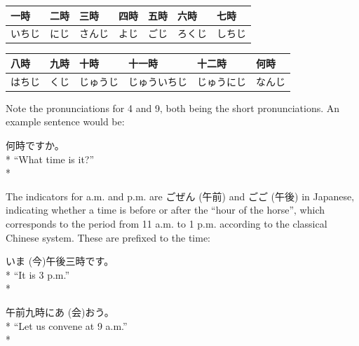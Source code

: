 \documentclass[11pt, b5paper, twoside, openright, onecolumn]{book}
\makeatletter
\newcommand*{\rubystack}[2]{{\relscale{0.5}%
  \begin{tabular}[b]{@{}c@{}}%
    {#1}\\%
   {\textscale{2}{#2}}%
  \end{tabular}}%
}
\DeclareRobustCommand*{\ruby}[2]{%
  \mbox{%
    \setlength{\parskip}{0ex}%
    \BeginAccSupp{method=pdfstringdef,ActualText={#1}}%
      \rubystack{\phantom{#2}}{#1}%
      \llap{%
        \rubystack{#2}{\phantom{#1}}%
      }%
    \EndAccSupp{}%
  }%
}
\renewcommand*{\ruby}[2]{#2 (#1)}%
\newenvironment{exampleblock}{
\setlength{\parindent}{0.6in}
\begin{minipage}[t]{\dimexpr\textwidth-\parindent}}
{\end{minipage}}
\newenvironment{mytabular}[1]{\noindent\hspace{0.4in}
\begin{tabular}[h]{#1}}{\end{tabular}}
\makeatother
\begin{document}
\vspace{0.5cm}
\smaller
\begin{mytabular}{| l  l  l  l  l  l  l |}\hline 
\rule{0pt}{2.4ex}一時 & 二時 & 三時 & 四時 & 五時 & 六時 & 七時\\ 
\hline
\rule{0pt}{2.4ex}いちじ & にじ & さんじ & よじ & ごじ & ろくじ & しちじ\\ 
\hline 
\end{mytabular}
\larger
\vspace{0.5cm}

\smaller
\begin{mytabular}{| l  l  l  l  l  l |}\hline 
\rule{0pt}{2.4ex}八時 & 九時 & 十時 & 十一時 & 十二時 & 何時\\ 
\hline
\rule{0pt}{2.4ex}はちじ & くじ & じゅうじ & じゅういちじ & じゅうにじ & なんじ\\ 
\hline 
\end{mytabular}
\larger
\vspace{0.5cm}


Note the pronunciations for 4 and 9‚ both being the short pronunciations. An example sentence would be:

\vspace{0.4cm}
\begin{exampleblock}
何時ですか。 \\* 
“What time is it?” \\* 
\end{exampleblock}
\vspace{0.2cm}

The indicators for a.m. and p.m. are \ruby{午前}{ごぜん} and \ruby{午後}{ごご} in Japanese‚ indicating whether a time is before or after the “hour of the horse”‚ which corresponds to the period from 11 a.m. to 1 p.m. according to the classical Chinese system. These are prefixed to the time:

\vspace{0.4cm}
\begin{exampleblock}
\ruby{今}{いま}午後三時です。 \\* 
“It is 3 p.m.” \\* 
\end{exampleblock}
\vspace{0.2cm}

\begin{exampleblock}
午前九時に\ruby{会}{あ}おう。 \\* 
“Let us convene at 9 a.m.” \\* 
\end{exampleblock}
\vspace{0.2cm}
\end{document}
